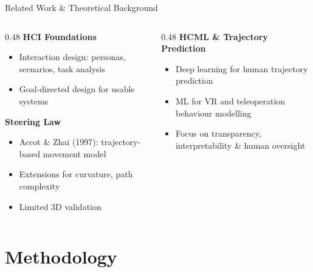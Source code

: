 \documentclass[aspectratio=169, 10pt]{beamer}
\begin{document}
\begin{frame}{Related Work \& Theoretical Background}
  \begin{columns}[T]
    \begin{column}{0.48\textwidth}
      \textbf{HCI Foundations}
      \begin{itemize}
        \item Interaction design: personas, scenarios, task analysis
        \item Goal-directed design for usable systems
      \end{itemize}

      \vspace{0.6em}
      \textbf{Steering Law}
      \begin{itemize}
        \item Accot \& Zhai (1997): trajectory-based movement model
        \item Extensions for curvature, path complexity
        \item Limited 3D validation
      \end{itemize}
    \end{column}
    \begin{column}{0.48\textwidth}
      \textbf{HCML \& Trajectory Prediction}
      \begin{itemize}
        \item Deep learning for human trajectory prediction
        \item ML for VR and teleoperation behaviour modelling
        \item Focus on transparency, interpretability \& human oversight
      \end{itemize}
    \end{column}
  \end{columns}
\end{frame}

\section{Methodology}
\end{document}
